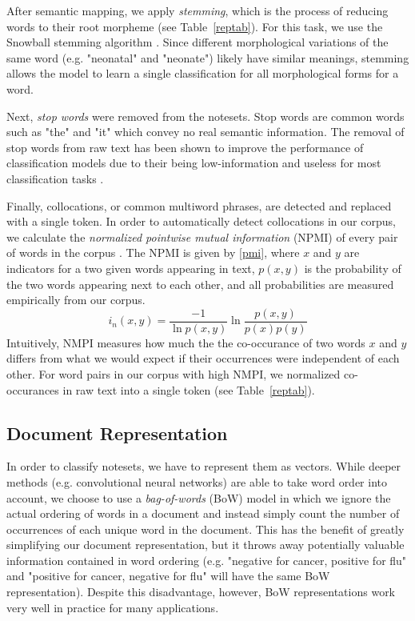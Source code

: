 \documentclass[conference]{IEEEtran}
\begin{document}
After semantic mapping, we apply \textit{stemming}, which is the process of reducing words to their root morpheme (see Table~\ref{reptab}). For this task, we use the Snowball stemming algorithm \cite{Porter}. Since different morphological variations of the same word (e.g. "neonatal" and "neonate") likely have similar meanings, stemming allows the model to learn  a single classification for all morphological forms for a word.

Next, \textit{stop words} were removed from the notesets. Stop words are common words such as "the" and "it" which convey no real semantic information. The removal of stop words from raw text has been shown to improve the performance of classification models due to their being low-information and useless for most classification tasks \cite{Silva}. 

Finally, collocations, or common multiword phrases, are detected and replaced with a single token. In order to automatically detect collocations in our corpus, we calculate the \textit{normalized pointwise mutual information} (NPMI) of every pair of words in the corpus \cite{Bouma}. The NPMI is given by \eqref{pmi}, where $x$ and $y$ are indicators for a two given words appearing in text, $p(x,y)$ is the probability of the two words appearing next to each other, and all probabilities are measured empirically from our corpus.
\begin{equation}
i_n(x,y) = \frac{-1}{\ln p(x,y)}\ln \frac{p(x,y)}{p(x)p(y)}\label{pmi}
\end{equation}
Intuitively, NMPI measures how much the the co-occurance of two words $x$ and $y$ differs from what we would expect if their occurrences were independent of each other. For word pairs in our corpus with high NMPI, we normalized co-occurances in raw text into a single token (see Table~\ref{reptab}).
\subsection{Document Representation}\label{AA}
In order to classify notesets, we have to represent them as vectors. While deeper methods (e.g. convolutional neural networks) are able to take word order into account, we choose to use a \textit{bag-of-words} (BoW) model in which we ignore the actual ordering of words in a document and instead simply count the number of occurrences of each unique word in the document. This has the benefit of greatly simplifying our document representation, but it throws away potentially valuable information contained in word ordering (e.g. "negative for cancer, positive for flu" and "positive for cancer, negative for flu" will have the same BoW representation). Despite this disadvantage, however, BoW representations work very well in practice for many applications.
\end{document}
